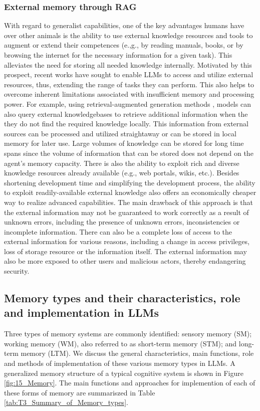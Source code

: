 \documentclass[10pt,journal,compsoc]{IEEEtran}
\begin{document}
	\subsubsection{External memory through RAG}
	With regard to generalist capabilities, one of the key advantages humans have over other animals is the ability to use external knowledge resources and tools to augment or extend their competences (e.,g., by reading manuals, books, or by browsing the internet for the necessary information for a given task). This alleviates the need for storing all needed knowledge internally. Motivated by this prospect, recent works have sought to enable LLMs to access and utilize external resources, thus, extending the range of tasks they can perform. This also helps to overcome inherent limitations associated with insufficient memory and processing power. For example, using retrieval-augmented generation methods \cite{zhao2024retrieval,schmied2024retrieval,wu2024retrieval,li2022survey}, models can also query external knowledgebases to retrieve additional information when the they do not find the required knowledge locally. This information from external sources can be processed and utilized straightaway or can be stored in local memory for later use. Large volumes of knowledge can be stored for long time spans since the volume of information that can be stored does not depend on the agent’s memory capacity. There is also the ability to exploit rich and diverse knowledge resources already available (e.g., web portals, wikis, etc.). Besides shortening development time and simplifying the development process, the ability to exploit readily-available external knowledge also offers an economically cheaper way to realize advanced capabilities. The main drawback of this approach is that the external information may not be guaranteed to work correctly as a result of unknown errors, including the presence of unknown errors, inconsistencies or incomplete information. There can also be a complete loss of access to the external information for various reasons, including a change in access privileges, loss of storage resource or the information itself. The external information may also be more exposed to other users and malicious actors, thereby endangering security.
	
	\subsection{Memory types and their characteristics, role and implementation in LLMs}
	Three types of memory systems are commonly identified: sensory memory (SM); working memory (WM), also referred to as short-term memory (STM); and long-term memory (LTM). We discuss the general characteristics, main functions, role and methods of implementation of these various memory types in LLMs. A generalized memory structure of a typical cognitive system is shown in Figure \ref{fig:15_Memory}. The main functions and approaches for implemention of each of these forms of memory are summariszed in Table \ref{tab:T3_Summary_of_Memory_types}.
	
\end{document}
